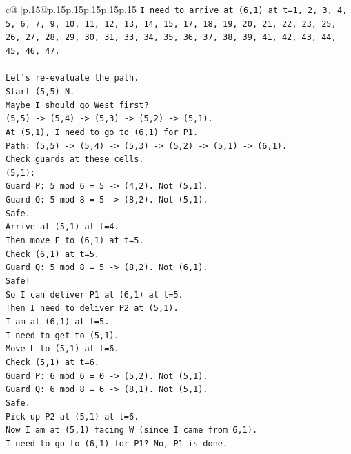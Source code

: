 \documentclass{article}
\begin{document}
{\begin{supertabular}{c@{$\;$}|p{.15\linewidth}@{}p{.15\linewidth}p{.15\linewidth}p{.15\linewidth}p{.15\linewidth}p{.15\linewidth}}
{{{\texttt{I need to arrive at (6,1) at t=1, 2, 3, 4, 5, 6, 7, 9, 10, 11, 12, 13, 14, 15, 17, 18, 19, 20, 21, 22, 23, 25, 26, 27, 28, 29, 30, 31, 33, 34, 35, 36, 37, 38, 39, 41, 42, 43, 44, 45, 46, 47.} \\
\\ 
\texttt{Let's re{-}evaluate the path.} \\
\texttt{Start (5,5) N.} \\
\texttt{Maybe I should go West first?} \\
\texttt{(5,5) {-}> (5,4) {-}> (5,3) {-}> (5,2) {-}> (5,1).} \\
\texttt{At (5,1), I need to go to (6,1) for P1.} \\
\texttt{Path: (5,5) {-}> (5,4) {-}> (5,3) {-}> (5,2) {-}> (5,1) {-}> (6,1).} \\
\texttt{Check guards at these cells.} \\
\texttt{(5,1):} \\
\texttt{Guard P: 5 mod 6 = 5 {-}> (4,2). Not (5,1).} \\
\texttt{Guard Q: 5 mod 8 = 5 {-}> (8,2). Not (5,1).} \\
\texttt{Safe.} \\
\texttt{Arrive at (5,1) at t=4.} \\
\texttt{Then move F to (6,1) at t=5.} \\
\texttt{Check (6,1) at t=5.} \\
\texttt{Guard Q: 5 mod 8 = 5 {-}> (8,2). Not (6,1).} \\
\texttt{Safe!} \\
\texttt{So I can deliver P1 at (6,1) at t=5.} \\
\texttt{Then I need to deliver P2 at (5,1).} \\
\texttt{I am at (6,1) at t=5.} \\
\texttt{I need to get to (5,1).} \\
\texttt{Move L to (5,1) at t=6.} \\
\texttt{Check (5,1) at t=6.} \\
\texttt{Guard P: 6 mod 6 = 0 {-}> (5,2). Not (5,1).} \\
\texttt{Guard Q: 6 mod 8 = 6 {-}> (8,1). Not (5,1).} \\
\texttt{Safe.} \\
\texttt{Pick up P2 at (5,1) at t=6.} \\
\texttt{Now I am at (5,1) facing W (since I came from 6,1).} \\
\texttt{I need to go to (6,1) for P1? No, P1 is done.} \\
}}}
\end{supertabular}}
\end{document}
